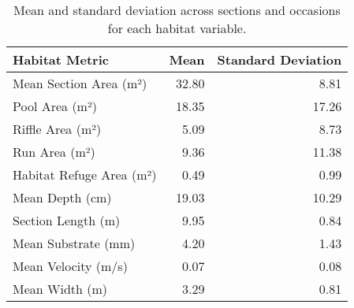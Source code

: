 \begin{table}[ht]
\centering
\caption{Mean and standard deviation across sections and occasions for each habitat variable.} 
\label{tab:habitat}
\begin{tabular}{lrr}
  \hline
Habitat Metric & Mean & Standard Deviation \\ 
  \hline
Mean Section Area (m²) & 32.80 & 8.81 \\ 
  Pool Area (m²) & 18.35 & 17.26 \\ 
  Riffle Area (m²) & 5.09 & 8.73 \\ 
  Run Area (m²) & 9.36 & 11.38 \\ 
  Habitat Refuge Area (m²) & 0.49 & 0.99 \\ 
  Mean Depth (cm) & 19.03 & 10.29 \\ 
  Section Length (m) & 9.95 & 0.84 \\ 
  Mean Substrate (mm) & 4.20 & 1.43 \\ 
  Mean Velocity (m/s) & 0.07 & 0.08 \\ 
  Mean Width (m) & 3.29 & 0.81 \\ 
   \hline
\end{tabular}
\end{table}
